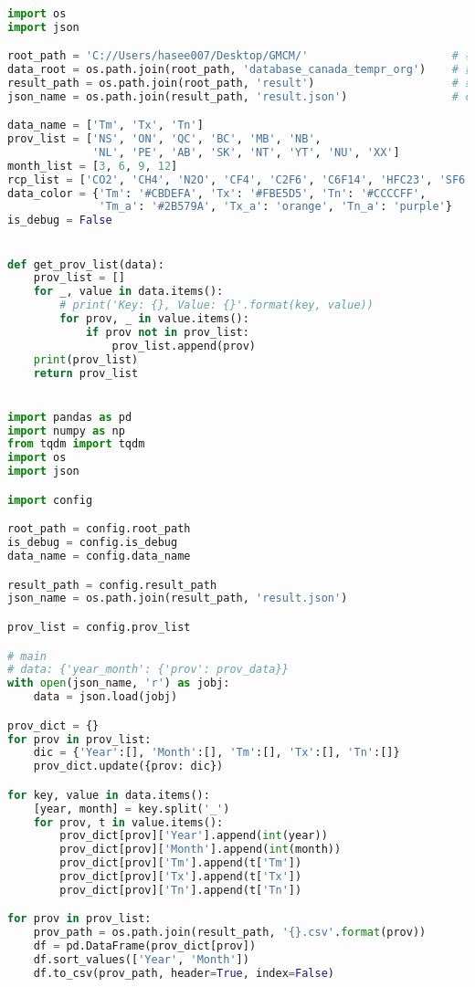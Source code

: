 \documentclass[bwprint]{gmcmthesis}
\begin{document}
\begin{lstlisting}[language=Python]%设置不同语言即可。

import os
import json

root_path = 'C://Users/hasee007/Desktop/GMCM/'                      # 根目录
data_root = os.path.join(root_path, 'database_canada_tempr_org')    # 数据根目录
result_path = os.path.join(root_path, 'result')                     # 结果目录
json_name = os.path.join(result_path, 'result.json')                # csv结果文件

data_name = ['Tm', 'Tx', 'Tn']
prov_list = ['NS', 'ON', 'QC', 'BC', 'MB', 'NB',
             'NL', 'PE', 'AB', 'SK', 'NT', 'YT', 'NU', 'XX']
month_list = [3, 6, 9, 12]
rcp_list = ['CO2', 'CH4', 'N2O', 'CF4', 'C2F6', 'C6F14', 'HFC23', 'SF6', 'CFC_11', 'CH3BR', 'CH3CL']
data_color = {'Tm': '#CBDEFA', 'Tx': '#FBE5D5', 'Tn': '#CCCCFF',
              'Tm_a': '#2B579A', 'Tx_a': 'orange', 'Tn_a': 'purple'}
is_debug = False


def get_prov_list(data):
    prov_list = []
    for _, value in data.items():
        # print('Key: {}, Value: {}'.format(key, value))
        for prov, _ in value.items():
            if prov not in prov_list:
                prov_list.append(prov)
    print(prov_list)
    return prov_list


import pandas as pd
import numpy as np
from tqdm import tqdm
import os
import json

import config

root_path = config.root_path
is_debug = config.is_debug
data_name = config.data_name

result_path = config.result_path
json_name = os.path.join(result_path, 'result.json')

prov_list = config.prov_list

# main
# data: {'year_month': {'prov': prov_data}}
with open(json_name, 'r') as jobj:
    data = json.load(jobj)

prov_dict = {}
for prov in prov_list:
    dic = {'Year':[], 'Month':[], 'Tm':[], 'Tx':[], 'Tn':[]}
    prov_dict.update({prov: dic})

for key, value in data.items():
    [year, month] = key.split('_')
    for prov, t in value.items():
        prov_dict[prov]['Year'].append(int(year))
        prov_dict[prov]['Month'].append(int(month))
        prov_dict[prov]['Tm'].append(t['Tm'])
        prov_dict[prov]['Tx'].append(t['Tx'])
        prov_dict[prov]['Tn'].append(t['Tn'])

for prov in prov_list:
    prov_path = os.path.join(result_path, '{}.csv'.format(prov))
    df = pd.DataFrame(prov_dict[prov])
    df.sort_values(['Year', 'Month'])
    df.to_csv(prov_path, header=True, index=False)



\end{lstlisting}
\end{document}
